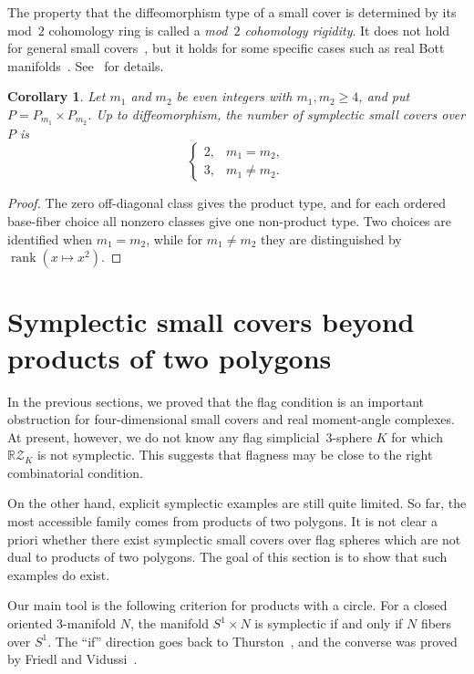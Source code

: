 \documentclass{amsart}
\newtheorem{corollary}[theorem]{Corollary}
\numberwithin{equation}{section}
\theoremstyle{definition}
\theoremstyle{remark}
\newcommand{\RZ}{\mathbb R\mathcal Z}
\DeclareMathOperator{\rank}{rank}
\begin{document}
The property that the diffeomorphism type of a small cover is determined by its mod~$2$ cohomology ring is called a \emph{mod~$2$ cohomology rigidity}.
It does not hold for general small covers~\cite{Masuda2010}, but it holds for some specific cases such as real Bott manifolds~\cite{Kamishima-Masuda2009,Choi-Masuda-Oum2017}.
See~\cite{Choi-Masuda-Suh2011} for details.

\begin{corollary} \label{cor:number_of_diffeo_types}
    Let $m_1$ and $m_2$ be even integers with $m_1,m_2\ge 4$, and put $P=P_{m_1}\times P_{m_2}$.
    Up to diffeomorphism, the number of symplectic small covers over $P$ is
    $$
        \begin{cases}
            2, & m_1=m_2,\\
            3, & m_1\ne m_2.
        \end{cases}
    $$
\end{corollary}
\begin{proof}
    The zero off-diagonal class gives the product type, and for each ordered base-fiber choice all nonzero classes give one non-product type.
    Two choices are identified when $m_1=m_2$, while for $m_1\ne m_2$ they are distinguished by $\rank(x\mapsto x^2)$.
\end{proof}



\section{Symplectic small covers beyond products of two polygons}

In the previous sections, we proved that the flag condition is an important obstruction for four-dimensional small covers and real moment-angle complexes.
At present, however, we do not know any flag simplicial~$3$-sphere $K$ for which $\RZ_K$ is not symplectic.
This suggests that flagness may be close to the right combinatorial condition.

On the other hand, explicit symplectic examples are still quite limited.
So far, the most accessible family comes from products of two polygons.
It is not clear a priori whether there exist symplectic small covers over flag spheres which are not dual to products of two polygons.
The goal of this section is to show that such examples do exist.

Our main tool is the following criterion for products with a circle.
For a closed oriented $3$-manifold $N$, the manifold $S^1\times N$ is symplectic if and only if $N$ fibers over $S^1$.
The ``if'' direction goes back to Thurston~\cite{Thurston1976}, and the converse was proved by Friedl and Vidussi~\cite{Friedl-Vidussi2011}.
\end{document}
